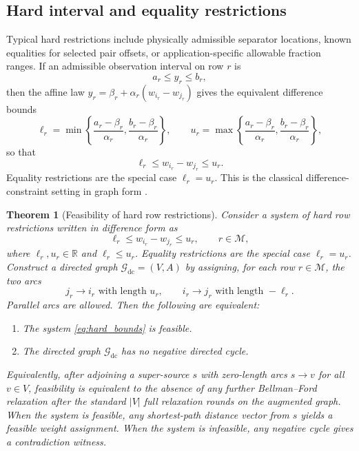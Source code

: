 \documentclass[preprint,12pt]{elsarticle}
\newtheorem{theorem}{Theorem}
\newcommand{\R}{\mathbb{R}}
\newcommand{\graph}{\mathcal{G}}
\newcommand{\rowset}{\mathcal{M}}
\begin{document}
\subsection{Hard interval and equality restrictions}
Typical hard restrictions include physically admissible separator locations,
known equalities for selected pair offsets, or application-specific allowable
fraction ranges. If an admissible observation interval on row $r$ is
\begin{equation}
    a_r\le y_r\le b_r,
\end{equation}
then the affine law $y_r=\beta_r+\alpha_r(w_{i_r}-w_{j_r})$ gives the
equivalent difference bounds
\begin{equation}
    \ell_r
    =
    \min\left\{
        \frac{a_r-\beta_r}{\alpha_r},
        \frac{b_r-\beta_r}{\alpha_r}
    \right\},
    \qquad
    u_r
    =
    \max\left\{
        \frac{a_r-\beta_r}{\alpha_r},
        \frac{b_r-\beta_r}{\alpha_r}
    \right\},
\end{equation}
so that
\begin{equation}
    \ell_r\le w_{i_r}-w_{j_r}\le u_r.
\end{equation}
Equality restrictions are the special case $\ell_r=u_r$. This is the classical
difference-constraint setting in graph form \cite{Bellman1958}.

\begin{theorem}[Feasibility of hard row restrictions]
\label{thm:feasibility}
Consider a system of hard row restrictions written in difference form as
\begin{equation}
    \ell_r \le w_{i_r}-w_{j_r} \le u_r,
    \qquad r\in\rowset,
    \label{eq:hard_bounds}
\end{equation}
where $\ell_r,u_r\in\R$ and $\ell_r\le u_r$. Equality restrictions are the
special case $\ell_r=u_r$. Construct a directed graph
$\graph_{\mathrm{dc}}=(V,A)$ by assigning, for each row $r\in\rowset$, the two
arcs
\begin{equation}
    j_r\to i_r \text{ with length } u_r,
    \qquad
    i_r\to j_r \text{ with length } -\ell_r.
    \label{eq:dc_arcs}
\end{equation}
Parallel arcs are allowed. Then the following are equivalent:
\begin{enumerate}
    \item The system \eqref{eq:hard_bounds} is feasible.
    \item The directed graph $\graph_{\mathrm{dc}}$ has no negative directed
    cycle.
\end{enumerate}
Equivalently, after adjoining a super-source $s$ with zero-length arcs
$s\to v$ for all $v\in V$, feasibility is equivalent to the absence of any
further Bellman--Ford relaxation after the standard $|V|$ full relaxation rounds
on the augmented graph. When the system is feasible, any shortest-path distance
vector from $s$ yields a feasible weight assignment. When the system is
infeasible, any negative cycle gives a contradiction witness.
\end{theorem}
\end{document}
